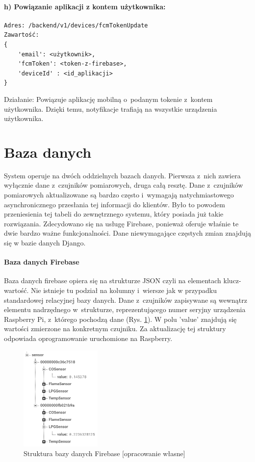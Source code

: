 \paragraph{h) Powiązanie aplikacji z kontem użytkownika:}
\begin{verbatim}
Adres: /backend/v1/devices/fcmTokenUpdate
Zawartość: 
{
	'email': <użytkownik>, 
	'fcmToken': <token-z-firebase>, 
	'deviceId' : <id_aplikacji>
}
\end{verbatim}
Działanie: Powiązuje aplikację mobilną o~podanym tokenie z~kontem użytkownika. Dzięki temu, notyfikacje trafiają na wszystkie urządzenia użytkownika.
\newline

\section{Baza danych}
System operuje na dwóch oddzielnych bazach danych. Pierwsza z~nich zawiera wyłącznie dane z~czujników pomiarowych, druga całą resztę. Dane z~czujników pomiarowych aktualizowane są bardzo często i~wymagają natychmiastowego asynchronicznego przesłania tej informacji do klientów. Było to powodem przeniesienia tej tabeli do zewnętrznego systemu, który posiada już takie rozwiązania. Zdecydowano się na usługę Firebase, ponieważ oferuje właśnie te dwie bardzo ważne funkcjonalności.  Dane niewymagające częstych zmian znajdują się w bazie danych Django.

\paragraph{Baza danych Firebase}
Baza danych firebase opiera się na strukturze JSON czyli na elementach klucz-wartość. Nie istnieje tu podział na kolumny i~wiersze jak w przypadku standardowej relacyjnej bazy danych. Dane z~czujników zapisywane są wewnątrz elementu nadrzędnego w~strukturze, reprezentującego numer seryjny urządzenia Raspberry Pi, z~którego pochodzą dane (Rys. \ref{json}). W polu 'value' znajdują się wartości zmierzone na konkretnym czujniku.  Za aktualizację tej struktury odpowiada oprogramowanie uruchomione na Raspberry.
\begin{figure}[H]
   \centering
   \includegraphics[width=4cm]{firebasejson.png} 
   \caption{Struktura bazy danych Firebase [opracowanie własne]}
   \label{json}
\end{figure}

